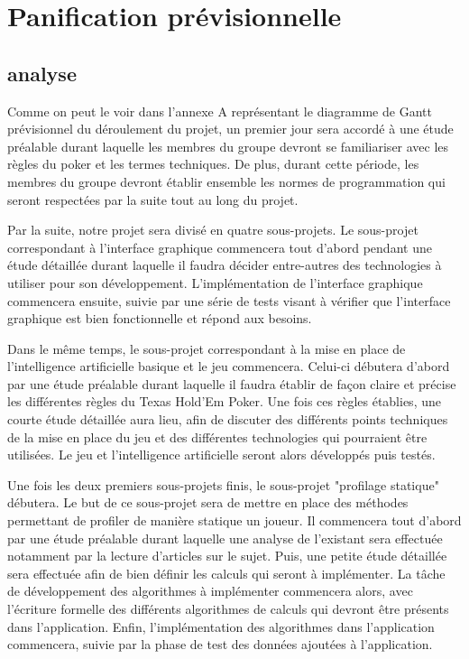 \documentclass{report}
\begin{document}
\chapter{Panification prévisionnelle}
\section{analyse}
\hspace{0.5cm}Comme on peut le voir dans l'annexe A représentant le diagramme de Gantt prévisionnel du déroulement du projet, un premier jour sera accordé à une étude préalable durant laquelle les membres du groupe devront se familiariser avec les règles du poker et les termes techniques. De plus, durant cette période, les membres du groupe devront établir ensemble les normes de programmation qui seront respectées par la suite tout au long du projet.\par
Par la suite, notre projet sera divisé en quatre sous-projets. 
Le sous-projet correspondant à l'interface graphique commencera tout d'abord pendant une étude détaillée durant laquelle il faudra décider entre-autres des technologies à utiliser pour son développement. L'implémentation de l'interface graphique commencera ensuite, suivie par une série de tests visant à vérifier que l'interface graphique est bien fonctionnelle et répond aux besoins. \par
Dans le même temps, le sous-projet correspondant à la mise en place de l'intelligence artificielle basique et le jeu commencera. Celui-ci débutera d'abord par une étude préalable durant laquelle il faudra établir de façon claire et précise les différentes règles du Texas Hold'Em Poker. Une fois ces règles établies, une courte étude détaillée aura lieu, afin de discuter des différents points techniques de la mise en place du jeu et des différentes technologies qui pourraient être utilisées. Le jeu et l'intelligence artificielle seront alors développés puis testés.\par
Une fois les deux premiers sous-projets finis, le sous-projet "profilage statique" débutera. Le but de ce sous-projet sera de mettre en place des méthodes permettant de profiler de manière statique un joueur. Il commencera tout d'abord par une étude préalable durant laquelle une analyse de l'existant sera effectuée notamment par la lecture d'articles sur le sujet. Puis, une petite étude détaillée sera effectuée afin de bien définir les calculs qui seront à implémenter. La tâche de développement des algorithmes à implémenter commencera alors, avec l'écriture formelle des différents algorithmes de calculs qui devront être présents dans l'application. Enfin, l'implémentation des algorithmes dans l'application commencera, suivie par la phase de test des données ajoutées à l'application. \par
\end{document}
